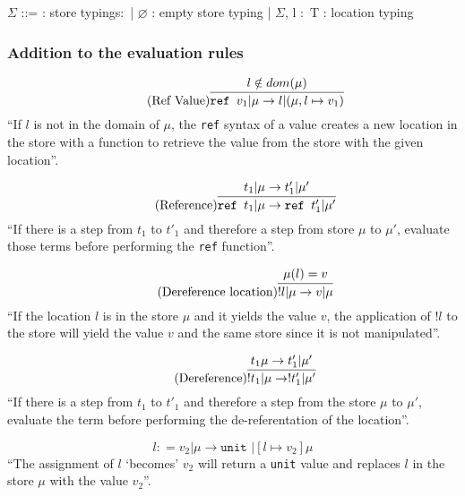 \begin{bnfgrammar}
    $\Sigma$ ::= : store typings$\colon$
    | $\varnothing$ : empty store typing
    | $\Sigma$, l $\colon$ T : location typing
\end{bnfgrammar}\leavevmode\newline

\subsubsection{Addition to the evaluation rules \cite{pierce2002ProgLang}}
\begin{equation*}
    \tag{Ref Value}
    \infer{
        \texttt{ref } v_1 | \mu \rightarrow l | (\mu, l \mapsto v_1)
    }{
        l \notin dom(\mu)
    }
\end{equation*}
``If $l$ is not in the domain of $\mu$, the \texttt{ref} syntax of a
value creates a new location in the store with a function to
retrieve the value from the store with the given location''.

\begin{equation*}
    \tag{Reference}
    \infer{
        \texttt{ref } t_1 | \mu \rightarrow \texttt{ref } t'_1 | \mu'
    }{
        t_1 | \mu \rightarrow t'_1 | \mu'
    }
\end{equation*}
``If there is a step from $t_1$ to $t'_1$ and therefore a step
from store $\mu$ to $\mu'$, evaluate those terms before
performing the \texttt{ref} function''.

\begin{equation*}
    \tag{Dereference location}
    \infer{
        !l | \mu \rightarrow v | \mu
    }{
        \mu(l) = v
    }
\end{equation*}
``If the location $l$ is in the store $\mu$ and it yields the value $v$,
the application of $!l$ to the store will yield the value $v$ and the
same store since it is not manipulated''.

\begin{equation*}
    \tag{Dereference}
    \infer{
        !t_1 | \mu \rightarrow !t'_1 | \mu'
    }{
        t_1 \mu \rightarrow t'_1 | \mu'
    }
\end{equation*}
``If there is a step from $t_1$ to $t'_1$ and therefore a step
from the store $\mu$ to $\mu'$, evaluate the term before
performing the de-referentation of the location''.

\begin{equation*}
    \tag{Assignment}
    l \colon = v_2 | \mu \rightarrow \texttt{unit } | [l \mapsto v_2] \mu
\end{equation*}
``The assignment of $l$ `becomes' $v_2$ will return a \texttt{unit} value
and replaces $l$ in the store $\mu$ with the value $v_2$''.

